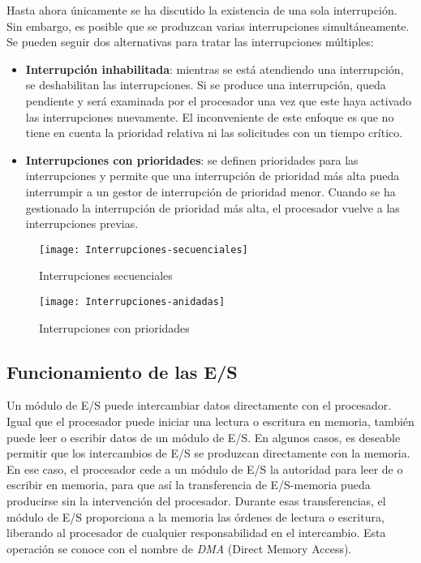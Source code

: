 Hasta ahora únicamente se ha discutido la existencia de una sola interrupción. Sin embargo, es posible que se produzcan varias interrupciones simultáneamente. 
Se pueden seguir dos alternativas para tratar las interrupciones múltiples:

\begin{itemize}
  \item \textbf{Interrupción inhabilitada}: mientras se está atendiendo una interrupción, se deshabilitan las interrupciones. Si se produce una interrupción, queda pendiente y será examinada por el procesador una vez que este haya activado las interrupciones nuevamente.
  El inconveniente de este enfoque es que no tiene en cuenta la prioridad relativa ni las solicitudes con un tiempo crítico. 
  \item \textbf{Interrupciones con prioridades}: se definen prioridades para las interrupciones y permite que una interrupción de prioridad más alta pueda interrumpir a un gestor de interrupción de prioridad menor. Cuando se ha gestionado la interrupción de prioridad más alta, el procesador vuelve a las interrupciones previas.
\end{itemize}

\begin{figure}[H]
  \centering
  \texttt{[image: Interrupciones-secuenciales]}
  \caption{Interrupciones secuenciales}
\end{figure}

\begin{figure}[H]
  \centering
  \texttt{[image: Interrupciones-anidadas]}
  \caption{Interrupciones con prioridades}
\end{figure}

\subsection{Funcionamiento de las E/S}

Un módulo de E/S puede intercambiar datos directamente con el procesador. Igual que el procesador puede iniciar una lectura o escritura en memoria, también puede leer o escribir datos de un módulo de E/S.
En algunos casos, es deseable permitir que los intercambios de E/S se produzcan directamente con la memoria. En ese caso, el procesador cede a un módulo de E/S la autoridad para leer de o escribir en memoria, para que así la transferencia de E/S-memoria pueda producirse sin la intervención  del procesador.
Durante esas transferencias, el módulo de E/S proporciona a la memoria las órdenes de lectura o escritura, liberando al procesador de cualquier responsabilidad en el intercambio. Esta operación se conoce con el nombre de \textit{DMA} (Direct Memory Access).

